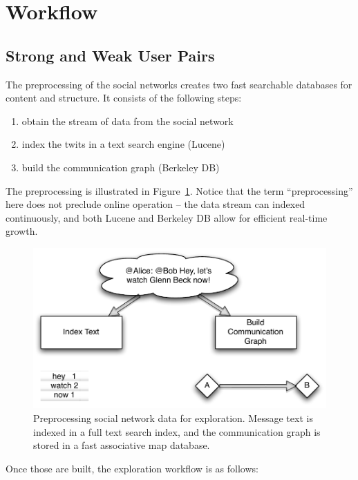 \section{Workflow}

\subsection{Strong and Weak User Pairs}

The preprocessing of the social networks creates two fast searchable databases for content and structure.  It consists of the following steps:

\begin{enumerate}
	\item obtain the stream of data from the social network
	\item index the twits in a text search engine (Lucene)
	\item build the communication graph (Berkeley DB)
\end{enumerate}

The preprocessing is illustrated in Figure~\ref{figure:preprocessing}.  Notice that the term ``preprocessing'' here does not preclude online operation -- the data stream can indexed continuously, and both Lucene and Berkeley DB allow for efficient real-time growth.

\begin{figure}[htp]
\includegraphics{figures/spie-preprocessing}
\caption{Preprocessing social network data for exploration.  Message text is indexed in a full text search index, and the communication graph is stored in a fast associative map database.}
\label{figure:preprocessing}
\end{figure}


Once those are built, the exploration workflow is as follows:


